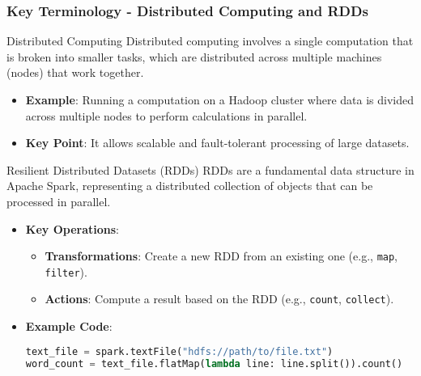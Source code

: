 \documentclass[aspectratio=169]{beamer}
\begin{document}
\begin{frame}[fragile]
    \frametitle{Key Terminology - Distributed Computing and RDDs}
    \begin{block}{Distributed Computing}
        Distributed computing involves a single computation that is broken into smaller tasks, which are distributed across multiple machines (nodes) that work together.
    \end{block}
    \pause
    \begin{itemize}
        \item \textbf{Example}: Running a computation on a Hadoop cluster where data is divided across multiple nodes to perform calculations in parallel.
        \item \textbf{Key Point}: It allows scalable and fault-tolerant processing of large datasets.
    \end{itemize}

    \begin{block}{Resilient Distributed Datasets (RDDs)}
        RDDs are a fundamental data structure in Apache Spark, representing a distributed collection of objects that can be processed in parallel.
    \end{block}
    \begin{itemize}
        \item \textbf{Key Operations}:
        \begin{itemize}
            \item \textbf{Transformations}: Create a new RDD from an existing one (e.g., \texttt{map}, \texttt{filter}).
            \item \textbf{Actions}: Compute a result based on the RDD (e.g., \texttt{count}, \texttt{collect}).
        \end{itemize}
        \item \textbf{Example Code}:
        \begin{lstlisting}[language=Python]
text_file = spark.textFile("hdfs://path/to/file.txt")
word_count = text_file.flatMap(lambda line: line.split()).count()
        \end{lstlisting}
    \end{itemize}
\end{frame}
\end{document}

